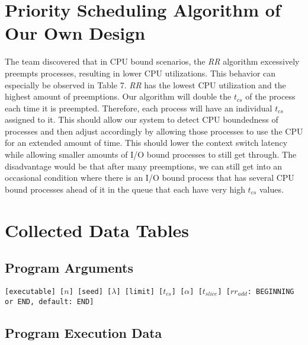 \documentclass{article}
\begin{document}
\section{Priority Scheduling Algorithm of Our Own Design}
\begin{doublespace}
The team discovered that in CPU bound scenarios, the \textit{RR} algorithm excessively preempts processes, resulting in 
lower CPU utilizations. This behavior can especially be observed in Table 7. \textit{RR} has the lowest CPU utilization 
and the highest amount of preemptions. Our algorithm will double the $t_{cs}$ of the process each time it is preempted. 
Therefore, each process will have an individual $t_{cs}$ assigned to it. This should allow our system to detect 
CPU boundedness of processes and then adjust accordingly by allowing those processes to use the CPU for an extended amount of time. 
This should lower the context switch latency while allowing smaller amounts of I/O bound processes to still get through. The 
disadvantage would be that after many preemptions, we can still get into an occasional condition where there is an I/O bound 
process that has several CPU bound processes ahead of it in the queue that each have very high $t_{cs}$ values. 
\end{doublespace}
\section{Collected Data Tables}
\subsection*{Program Arguments}
{\tt[executable] [$n$] [seed] [$\lambda$] [limit] [$t_{cs}$] [$\alpha$] [$t_{slice}$] [$rr_{add}$: BEGINNING or END, default: END]}

\subsection*{Program Execution Data}
\end{document}
